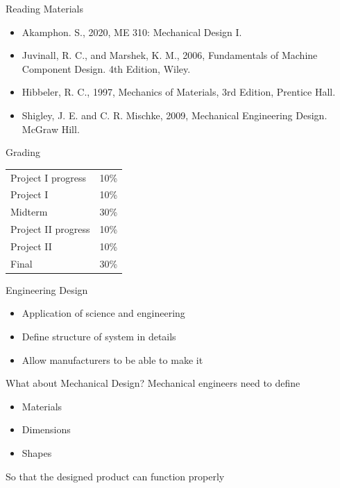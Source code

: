 \documentclass[10pt, svgnames]{beamer}
\begin{document}
\begin{frame}[label={sec:org5ba24aa}]{Reading Materials}
\begin{itemize}
\item Akamphon. S., 2020, ME 310: Mechanical Design I.

\item Juvinall, R. C., and Marshek, K. M., 2006, Fundamentals of Machine
Component Design. 4th Edition, Wiley.

\item Hibbeler, R. C., 1997, Mechanics of Materials, 3rd Edition, Prentice
Hall.

\item Shigley, J. E. and C. R. Mischke, 2009, Mechanical Engineering Design.
McGraw Hill.
\end{itemize}
\end{frame}

\begin{frame}[label={sec:org904268d}]{Grading}
\begin{center}
  \begin{tabular}{ll}
    \toprule
    Project I progress & 10\% \\
    Project I & 10\% \\
    Midterm & 30\% \\
    Project II progress & 10\% \\
    Project II & 10\% \\
    Final & 30\% \\
    \bottomrule
  \end{tabular}
\end{center}
\end{frame}

\begin{frame}[label={sec:orgd911876}]{Engineering Design}
\begin{itemize}
\item Application of science and engineering
\item Define structure of system in details
\item Allow manufacturers to be able to make it
\end{itemize}
\end{frame}

\begin{frame}[label={sec:org5714a6d}]{What about Mechanical Design?}
Mechanical engineers need to define

\begin{itemize}
\item Materials
\item Dimensions
\item Shapes
\end{itemize}

So that the designed product can function properly
\end{frame}
\end{document}
